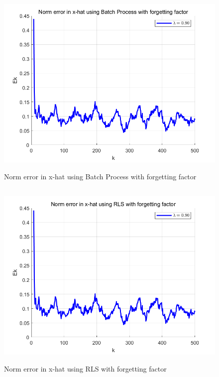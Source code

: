 \documentclass{article}
\theoremstyle{definition} %
\begin{document}
\subsection{}
\begin{figure}[H]
    \centering
        \textsf{\includegraphics[width=0.6\columnwidth]{HW7-prob5-fig2.png}}
        \caption{Norm error in x-hat using Batch Process with forgetting factor}
        \label{fig: 5-2}
\end{figure}

\subsection{}
\begin{figure}[H]
    \centering
        \textsf{\includegraphics[width=0.6\columnwidth]{HW7-prob5-fig3.png}}
        \caption{Norm error in x-hat using RLS with forgetting factor}
        \label{fig: 5-3}
\end{figure}

\section{}
\subsection{}
\end{document}
